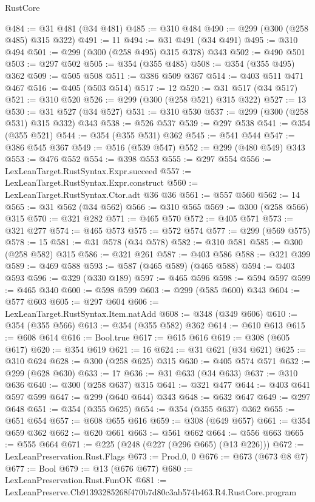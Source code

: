 \begin{lexlean}{RustCore}
\begin{coremodule}
@484 := @31 @481 (@34 @481)
@485 := @310 @484
@490 := @299 (@300 (@258 @485) @315 @322)
@491 := 11
@494 := @31 @491 (@34 @491)
@495 := @310 @494
@501 := @299 (@300 (@258 @495) @315 @378) @343
@502 := @490 @501
@503 := @297 @502
@505 := @354 (@355 @485)
@508 := @354 (@355 @495) @362
@509 := @505 @508
@511 := @386 @509 @367
@514 := @403 @511 @471 @467
@516 := @405 (@503 @514)
@517 := 12
@520 := @31 @517 (@34 @517)
@521 := @310 @520
@526 := @299 (@300 (@258 @521) @315 @322)
@527 := 13
@530 := @31 @527 (@34 @527)
@531 := @310 @530
@537 := @299 (@300 (@258 @531) @315 @332) @343
@538 := @526 @537
@539 := @297 @538
@541 := @354 (@355 @521)
@544 := @354 (@355 @531) @362
@545 := @541 @544
@547 := @386 @545 @367
@549 := @516 (@539 @547)
@552 := @299 (@480 @549) @343
@553 := @476 @552
@554 := @398 @553
@555 := @297 @554
@556 := LexLeanTarget.RustSyntax.Expr.succeed
@557 := LexLeanTarget.RustSyntax.Expr.construct
@560 := LexLeanTarget.RustSyntax.Ctor.adt @36 @36
@561 := @557 @560
@562 := 14
@565 := @31 @562 (@34 @562)
@566 := @310 @565
@569 := @300 (@258 @566) @315
@570 := @321 @282
@571 := @465 @570
@572 := @405 @571
@573 := @321 @277
@574 := @465 @573
@575 := @572 @574
@577 := @299 (@569 @575)
@578 := 15
@581 := @31 @578 (@34 @578)
@582 := @310 @581
@585 := @300 (@258 @582) @315
@586 := @321 @261
@587 := @403 @586
@588 := @321 @399
@589 := @469 @588
@593 := @587 (@465 @589) (@465 @588)
@594 := @403 @593
@596 := @329 (@330 @189)
@597 := @465 @596
@598 := @594 @597
@599 := @465 @340
@600 := @598 @599
@603 := @299 (@585 @600) @343
@604 := @577 @603
@605 := @297 @604
@606 := LexLeanTarget.RustSyntax.Item.natAdd
@608 := @348 (@349 @606)
@610 := @354 (@355 @566)
@613 := @354 (@355 @582) @362
@614 := @610 @613
@615 := @608 @614
@616 := Bool.true
@617 := @615 @616
@619 := @308 (@605 @617)
@620 := @354 @619
@621 := 16
@624 := @31 @621 (@34 @621)
@625 := @310 @624
@628 := @300 (@258 @625) @315
@630 := @405 @574 @571
@632 := @299 (@628 @630)
@633 := 17
@636 := @31 @633 (@34 @633)
@637 := @310 @636
@640 := @300 (@258 @637) @315
@641 := @321 @477
@644 := @403 @641 @597 @599
@647 := @299 (@640 @644) @343
@648 := @632 @647
@649 := @297 @648
@651 := @354 (@355 @625)
@654 := @354 (@355 @637) @362
@655 := @651 @654
@657 := @608 @655 @616
@659 := @308 (@649 @657)
@661 := @354 @659 @362
@662 := @620 @661
@663 := @561 @662
@664 := @556 @663
@665 := @555 @664
@671 := @225 (@248 (@227 (@296 @665) (@13 @226)))
@672 := LexLeanPreservation.Rust.Flags
@673 := Prod.{0, 0}
@676 := @673 (@673 @8 @7)
@677 := Bool
@679 := @13 (@676 @677)
@680 := LexLeanPreservation.Rust.FunOK
@681 := LexLeanPreserve.Cb91393285268f470b7d80c3ab574b463.R4.RustCore.program

\end{coremodule}
\end{lexlean}
